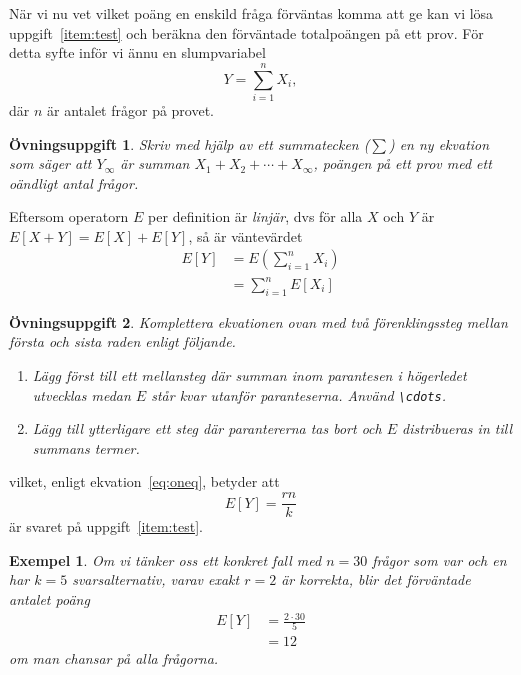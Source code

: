 \documentclass[12pt,a4wide]{article}
\newtheorem{exempel}{Exempel} %
\theoremstyle{uppgiftsstil}
\newcommand{\ovningstext}{Övningsuppgift}
\newtheorem{ovning}{\ovningstext}
\newenvironment{uppgift}{\begin{framed}\begin{ovning}}%
                        {\end{ovning}\end{framed}}
\theoremstyle{avklaradstil}
\begin{document}
När vi nu vet vilket poäng en enskild fråga förväntas komma att ge kan
vi lösa uppgift~\ref{item:test} och beräkna den förväntade
totalpoängen på ett prov. För detta syfte inför vi ännu en
slumpvariabel 
%
\begin{equation*}
  Y = \sum_{i = 1}^n X_i,
\end{equation*}
%
där $n$ är antalet frågor på provet. 
%
\begin{uppgift}
  Skriv med hjälp av ett summatecken ($\sum$) en ny ekvation som säger
  att $Y_{\infty}$ är summan $X_1  + X_2 + \cdots + X_\infty$, poängen på
  ett prov med ett oändligt antal frågor. 
\end{uppgift}
%
Eftersom operatorn $E$ per definition är \emph{linjär}, dvs för alla
$X$ och $Y$ är $E[X + Y] = E[X] + E[Y]$, så är väntevärdet
%
\begin{align*}  %
  E[Y] &= E\left(\sum_{i = 1}^n X_i\right) \\
       &= \sum_{i = 1}^n E[X_i]
\end{align*}
%
\begin{uppgift}
  Komplettera ekvationen ovan med två förenklingssteg mellan första
  och sista raden enligt följande.
%
  \begin{enumerate}
    \item Lägg först till ett mellansteg där summan inom parantesen i
      högerledet utvecklas medan $E$ står kvar utanför
      paranteserna. Använd \verb|\cdots|. 
%
    \item Lägg till ytterligare ett steg där parantererna tas bort och
      $E$ distribueras in till summans termer.  
\end{enumerate}
%
\end{uppgift}
%
vilket, enligt ekvation~\ref{eq:oneq}, betyder att 
%
\begin{equation*}                              %
  E[Y] = \boxed{\frac{rn}{k}} \label{eq:total} %
\end{equation*}
%
är svaret på uppgift~\ref{item:test}. %

\begin{exempel}  %
  Om vi tänker oss ett konkret fall med $n = 30$ frågor som var och en
  har $k = 5$ svarsalternativ, varav exakt $r = 2$ är korrekta, blir det
  förväntade antalet poäng
%  
  \begin{align*}
    E[Y] &= \frac{2 \cdot 30}{5} \\ %
         &= 12
  \end{align*}
%
  om man chansar på alla frågorna.
\end{exempel}
\end{document}

